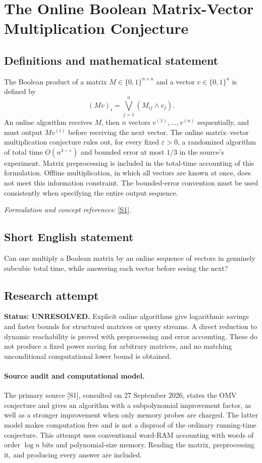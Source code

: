 \documentclass[11pt]{article}
\begin{document}
\section*{\texorpdfstring{The Online Boolean Matrix-Vector Multiplication Conjecture}{The Online Boolean Matrix-Vector Multiplication Conjecture}}\label{311}
\subsection{Definitions and mathematical statement}
The Boolean product of a matrix $M\in\{0,1\}^{n\times n}$ and a vector $v\in\{0,1\}^n$ is defined by
\[
 (Mv)_i=\bigvee_{j=1}^n(M_{ij}\wedge v_j).
\]
An online algorithm receives $M$, then $n$ vectors $v^{(1)},\ldots,v^{(n)}$ sequentially, and must output $Mv^{(t)}$ before receiving the next vector. The online matrix--vector multiplication conjecture rules out, for every fixed ${\varepsilon}>0$, a randomized algorithm of total time $O(n^{3-{\varepsilon}})$ and bounded error at most $1/3$ in the source's experiment. Matrix preprocessing is included in the total-time accounting of this formulation. Offline multiplication, in which all vectors are known at once, does not meet this information constraint. The bounded-error convention must be used consistently when specifying the entire output sequence.
\par\smallskip\textit{Formulation and concept references:} \href{https://people.csail.mit.edu/virgi/6.1420/papers/omvalg.pdf}{[S1]}.

\subsection{Short English statement}
Can one multiply a Boolean matrix by an online sequence of vectors in genuinely subcubic total time, while answering each vector before seeing the next?
\subsection{Research attempt}
\textbf{Status: UNRESOLVED.} Explicit online algorithms give logarithmic savings and faster bounds for structured matrices or query streams. A direct reduction to dynamic reachability is proved with preprocessing and error accounting. These do not produce a fixed power saving for arbitrary matrices, and no matching unconditional computational lower bound is obtained.

\paragraph{Source audit and computational model.}
The primary source [S1], consulted on 27 September 2026, states the OMV conjecture and gives an algorithm with a subpolynomial improvement factor, as well as a stronger improvement when only memory probes are charged. The latter model makes computation free and is not a disproof of the ordinary running-time conjecture. This attempt uses conventional word-RAM accounting with words of order $\log n$ bits and polynomial-size memory. Reading the matrix, preprocessing it, and producing every answer are included.
\end{document}
